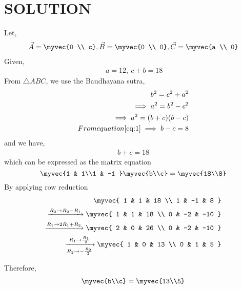 \documentclass[journal,12pt,twocolumn]{IEEEtran}
\begin{document}
\section{SOLUTION}
 Let,
\begin{align}
\Vec{A}=\myvec{0 \\ c},
\Vec{B}=\myvec{0 \\ 0} ,
\Vec{C}=\myvec{a \\ 0}
\end{align}
 Given,
\begin{align}
\label{eq:1}
\ a= 12,
\ c+b = 18
\end{align}
 From  $\triangle ABC$, we use the Baudhayana sutra,
\begin{align}
\ b^2=c^2+a^2
\\
\implies a^2=b^2-c^2
\\
\implies a^2=(b+c)(b-c)
\\
 From equation \eqref{eq:1}
\implies b-c=8
\end{align}
and we have,
\begin{align}
b+c=18
\end{align}
which can be expressed as the matrix equation
\begin{equation}
 \myvec{1 & 1\\1 & -1 }\myvec{b\\c} = \myvec{18\\8}
\end{equation}
By applying row reduction 
\begin{align}
\myvec{
1 & 1   & 18 
\\
1 & -1   & 8 
}
\\
  \xrightarrow{R_2\rightarrow R_2-R_1}
\myvec{
1 & 1   & 18
\\
0 & -2   & -10 
} 
\\
  \xrightarrow{R_1\rightarrow 2R_1+R_2} 
\myvec{
2 & 0   & 26 
\\
0 & -2   & -10 
}
\\
 \xrightarrow[R_2 \rightarrow -\frac{R_2}{2}]{R_1\rightarrow \frac{R_1}{2}} 
\myvec{
1 & 0   & 13 
\\
0 & 1   & 5 
}
\end{align}

Therefore,
\begin{align}
\myvec{b\\c} = \myvec{13\\5}
\end{align}
\end{document}
